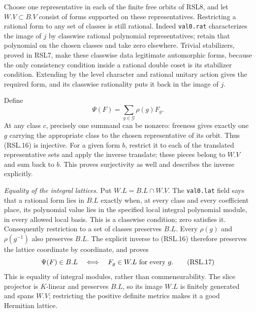 Choose one representative in each of the finite free orbits of
RSL8, and let $W.V\subset B.V$ consist of forms supported on
these representatives.  Restricting a rational form to any set
of classes is still rational.  Indeed \texttt{val0.rat}
characterizes the image of $j$ by classwise rational polynomial
representatives; retain that polynomial on the chosen classes
and take zero elsewhere.  Trivial stabilizers, proved in RSL7,
make these classwise data legitimate automorphic forms, because
the only consistency condition inside a rational double coset
is its stabilizer condition.  Extending by the level character
and rational unitary action gives the required form, and its
classwise rationality puts it back in the image of $j$.

Define
\[
                       \Psi(F)=\sum_{g\in\mathscr G}\rho(g)F_g.
                                                                  \tag{RSL.16}
\]
At any class $c$, precisely one summand can be nonzero: freeness
gives exactly one $g$ carrying the appropriate class to the
chosen representative of its orbit.  Thus (RSL.16) is injective.
For a given form $b$, restrict it to each of the translated
representative sets and apply the inverse translate; these
pieces belong to $W.V$ and sum back to $b$.  This proves
surjectivity as well and describes the inverse explicitly.

\emph{Equality of the integral lattices.}
Put $W.L=B.L\cap W.V$.  The \texttt{val0.lat} field says that a
rational form lies in $B.L$ exactly when, at every class and
every coefficient place, its polynomial value lies in the
specified local integral polynomial module, in every allowed
local basis.  This is a classwise condition; zero satisfies it.
Consequently restriction to a set of classes preserves $B.L$.
Every $\rho(g)$ and $\rho(g^{-1})$ also preserves $B.L$.
The explicit inverse to (RSL.16) therefore preserves the
lattice coordinate by coordinate, and proves
\[
       \Psi(F)\in B.L\quad\Longleftrightarrow\quad
                    F_g\in W.L\ \hbox{for every }g.
                                                                  \tag{RSL.17}
\]
This is equality of integral modules, rather than commensurability.
The slice projector is $K$-linear and preserves $B.L$, so its
image $W.L$ is finitely generated and spans $W.V$; restricting
the positive definite metrics makes it a good Hermitian lattice.

